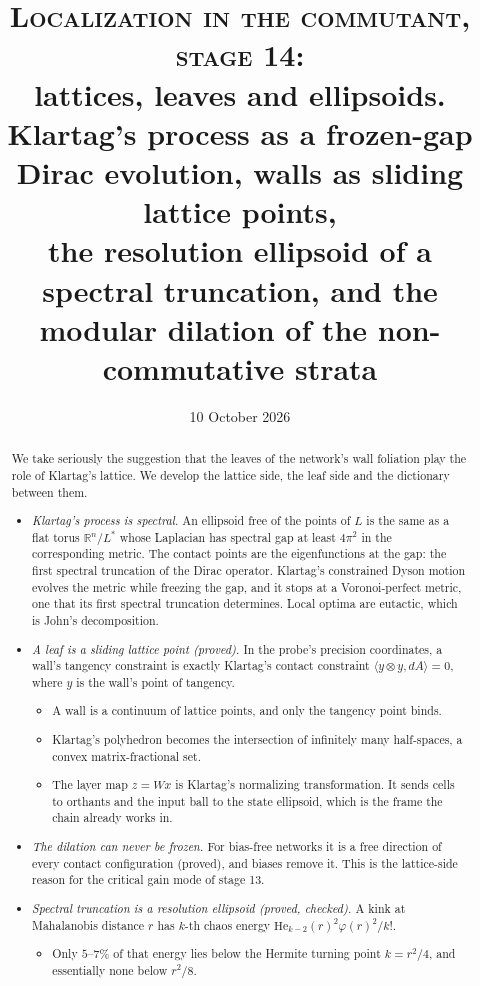 \documentclass[11pt]{article}
\title{\textsc{Localization in the commutant, stage 14:}\\ \large lattices, leaves and ellipsoids.\\
Klartag's process as a frozen-gap Dirac evolution, walls as sliding lattice points,\\ the resolution ellipsoid of a spectral truncation,
and the modular dilation of the non-commutative strata}
\author{}
\date{10 October 2026}
\theoremstyle{plain}
\theoremstyle{definition}\newtheorem{definition}[theorem]{Definition}\newtheorem{remark}[theorem]{Remark}
\newcommand{\R}{\mathbb R}\newcommand{\Z}{\mathbb Z}\newcommand{\E}{\mathbb E}\newcommand{\Var}{\operatorname{Var}}\newcommand{\Cov}{\operatorname{Cov}}
\newcommand{\He}{\mathrm{He}}\newcommand{\Fa}{\Phi_{\mathrm F}}\newcommand{\cZ}{\mathcal Z}\newcommand{\Sym}{\operatorname{Sym}}
\begin{document}
\maketitle
\begin{abstract}
We take seriously the suggestion that the leaves of the network's wall foliation play the role of Klartag's lattice. We develop the
lattice side, the leaf side and the dictionary between them.
\begin{itemize}[leftmargin=*]
\item \emph{Klartag's process is spectral.} An ellipsoid free of the points of $L$ is the same as a flat torus $\R^n/L^*$ whose Laplacian
has spectral gap at least $4\pi^2$ in the corresponding metric. The contact points are the eigenfunctions at the gap: the first spectral
truncation of the Dirac operator. Klartag's constrained Dyson motion evolves the metric while freezing the gap, and it stops at a
Voronoi-perfect metric, one that its first spectral truncation determines. Local optima are eutactic, which is John's decomposition.
\item \emph{A leaf is a sliding lattice point (proved).} In the probe's precision coordinates, a wall's tangency constraint is exactly
Klartag's contact constraint $\langle y\otimes y,dA\rangle=0$, where $y$ is the wall's point of tangency.
\begin{itemize}
\item A wall is a continuum of lattice points, and only the tangency point binds.
\item Klartag's polyhedron becomes the intersection of infinitely many half-spaces, a convex matrix-fractional set.
\item The layer map $z=Wx$ is Klartag's normalizing transformation. It sends cells to orthants and the input ball to the state
ellipsoid, which is the frame the chain already works in.
\end{itemize}
\item \emph{The dilation can never be frozen.} For bias-free networks it is a free direction of every contact configuration (proved),
and biases remove it. This is the lattice-side reason for the critical gain mode of stage 13.
\item \emph{Spectral truncation is a resolution ellipsoid (proved, checked).} A kink at Mahalanobis distance $r$ has $k$-th chaos energy
$\He_{k-2}(r)^2\varphi(r)^2/k!$.
\begin{itemize}
\item Only $5$--$7\%$ of that energy lies below the Hermite turning point $k=r^2/4$, and essentially none below $r^2/8$.

\end{itemize}
\end{itemize}
\end{abstract}
\end{document}

